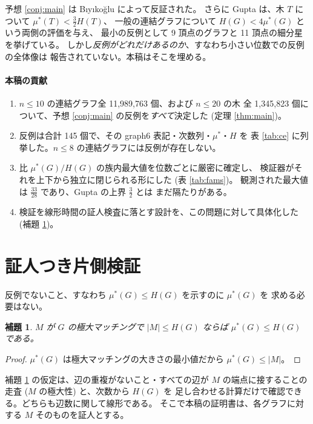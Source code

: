 \documentclass[paper=a4,fontsize=10.5pt,jafontsize=10.5pt]{jlreq}
\theoremstyle{plain}
\newtheorem{lemma}[theorem]{補題}
\theoremstyle{definition}
\begin{document}
予想 \ref{conj:main} は Bıyıkoğlu \cite{biyikoglu} によって反証された。
さらに Gupta \cite{gupta} は、木 $T$ について $\mu^*(T) < \tfrac{3}{2} H(T)$、
一般の連結グラフについて $H(G) < 4\mu^*(G)$ という両側の評価を与え、
最小の反例として 9 頂点のグラフと 11 頂点の細分星を挙げている。
しかし\emph{反例がどれだけあるのか}、すなわち小さい位数での反例の全体像は
報告されていない。本稿はそこを埋める。

\paragraph{本稿の貢献}
\begin{enumerate}
\item $n \le 10$ の連結グラフ全 11,989,763 個、および $n \le 20$ の木
  全 1,345,823 個について、予想 \ref{conj:main} の反例を\emph{すべて}決定した
  (定理 \ref{thm:main})。
\item 反例は合計 145 個で、その graph6 表記・次数列・$\mu^*$・$H$ を
  表 \ref{tab:ce} に列挙した。$n \le 8$ の連結グラフには反例が存在しない。
\item 比 $\mu^*(G)/H(G)$ の族内最大値を位数ごとに厳密に確定し、
  検証器がそれを上下から独立に閉じられる形にした (表 \ref{tab:fams})。
  観測された最大値は $\frac{33}{28}$ であり、Gupta の上界 $\tfrac{3}{2}$ とは
  まだ隔たりがある。
\item 検証を線形時間の証人検査に落とす設計を、この問題に対して具体化した
  (補題 \ref{lem:witness})。
\end{enumerate}

\section{証人つき片側検証}\label{sec:design}

反例でないこと、すなわち $\mu^*(G) \le H(G)$ を示すのに $\mu^*(G)$ を
求める必要はない。

\begin{lemma}\label{lem:witness}
$M$ が $G$ の極大マッチングで $|M| \le H(G)$ ならば $\mu^*(G) \le H(G)$ である。
\end{lemma}

\begin{proof}
$\mu^*(G)$ は極大マッチングの大きさの最小値だから $\mu^*(G) \le |M|$。
\end{proof}

補題 \ref{lem:witness} の仮定は、辺の重複がないこと・すべての辺が
$M$ の端点に接することの走査 ($M$ の極大性) と、次数から $H(G)$ を
足し合わせる計算だけで確認できる。どちらも辺数に関して線形である。
そこで本稿の証明書は、各グラフに対する $M$ そのものを証人とする。
\end{document}
